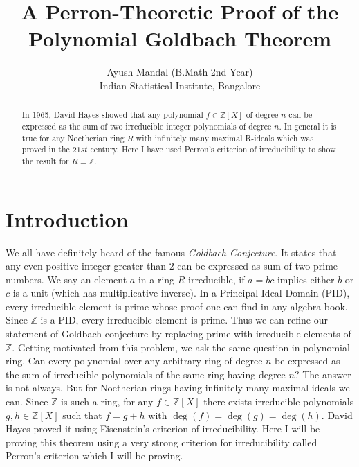 \documentclass[11pt]{article}
\title{A Perron-Theoretic Proof of the Polynomial Goldbach Theorem}
\author{Ayush Mandal (B.Math 2nd Year) \\ \normalsize Indian Statistical Institute, Bangalore}
\date{}
\theoremstyle{definition} %
\begin{document}
\maketitle

\pagestyle{fancy}
\fancyhf{} %
\cfoot{\thepage} %
\renewcommand{\headrulewidth}{0.4pt} %

\begin{abstract}
    In 1965, David Hayes showed that any polynomial $f\in \mathbb{Z}[X]$ of degree $n$ can be expressed as 
    the sum of two irreducible integer polynomials of degree $n$. In general it is true for any Noetherian ring $R$
    with infinitely many maximal R-ideals which was proved in the $21st$ century. Here I have used Perron's criterion
    of irreducibility to show the result for $R=\mathbb{Z}$.
\end{abstract}

\section{Introduction}
We all have definitely heard of the famous \textit{Goldbach Conjecture}.
It states that any even positive integer greater than $2$ can be expressed as sum of two prime numbers. 
 We say an element $a$ in a ring $R$ irreducible, if 
$a=bc$ implies either $b$ or $c$ is a unit (which has multiplicative inverse). In a Principal Ideal Domain (PID), every irreducible element is prime 
whose proof one can find in any algebra book. Since $\mathbb{Z}$ is a PID, every irreducible element is prime. Thus we can refine our statement of Goldbach 
conjecture by replacing prime with irreducible elements of $\mathbb{Z}$. Getting motivated from this problem, we ask the same question in polynomial ring.
Can every polynomial over any arbitrary ring of degree $n$ be expressed as the sum of irreducible polynomials of the same ring having degree $n$? The answer is not 
always. But for Noetherian rings having infinitely many maximal ideals we can. Since $\mathbb{Z}$ is such a ring, for any $f\in \mathbb{Z}[X]$ there exists 
irreducible polynomials $g,h\in \mathbb{Z}[X]$ such that $f=g+h$ with $\deg(f)=\deg(g)=\deg(h)$. David Hayes proved it using Eisenstein's criterion of 
irreducibility. Here I will be proving this theorem using a very strong criterion for irreducibility called Perron's criterion which I will be proving.
\end{document}
